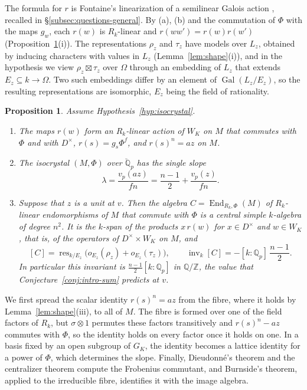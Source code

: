 \documentclass[a4paper,11pt]{amsart}
\newtheorem{proposition}[theorem]{Proposition}
\theoremstyle{definition}
\theoremstyle{remark}
\numberwithin{equation}{section}
\newcommand{\Q}{\mathbb{Q}}
\newcommand{\Z}{\mathbb{Z}}
\DeclareMathOperator{\inv}{inv}
\DeclareMathOperator{\res}{res}
\DeclareMathOperator{\End}{End}
\DeclareMathOperator{\Gal}{Gal}
\newcommand{\Qb}{\breve{\mathbb{Q}}_p}
\begin{document}
The formula for $r$ is Fontaine's linearization of a semilinear Galois action \cite[1.3.1 and~1.3.5]{Fon94}, recalled in \S\ref{subsec:questions-general}. By (a), (b) and the commutation of $\Phi$ with the maps $g_w$, each $r(w)$ is $R_k$-linear and $r(ww')=r(w)r(w')$ (Proposition~\ref{prop:conditional-isocrystal}(i)). The representations $\rho_z$ and $\tau_z$ have models over $L_z$, obtained by inducing characters with values in $L_z$ (Lemma~\ref{lem:shape}(i)), and in the hypothesis we view $\rho_z\boxtimes\tau_z$ over $\Omega$ through an embedding of $L_z$ that extends $E_z\subseteq k\to\Omega$. Two such embeddings differ by an element of $\Gal(L_z/E_z)$, so the resulting representations are isomorphic, $E_z$ being the field of rationality.

\begin{proposition}\label{prop:conditional-isocrystal}
Assume Hypothesis~\ref{hyp:isocrystal}.
\begin{enumerate}
\item[(i)] The maps $r(w)$ form an $R_k$-linear action of $W_K$ on $M$ that commutes with $\Phi$ and with $D^\times$, $r(s)=g_s\Phi^f$, and $r(s)^n=az$ on $M$.
\item[(ii)] The isocrystal $(M,\Phi)$ over $\Qb$ has the single slope
\[
 \lambda=\frac{v_p(az)}{fn}=\frac{n-1}2+\frac{v_p(z)}{fn}.
\]
\item[(iii)] Suppose that $z$ is a unit at $v$. Then the algebra $C=\End_{R_k,\Phi}(M)$ of $R_k$-linear endomorphisms of $M$ that commute with $\Phi$ is a central simple $k$-algebra of degree $n^2$. It is the $k$-span of the products $x\,r(w)$ for $x\in D^\times$ and $w\in W_K$, that is, of the operators of $D^\times\times W_K$ on $M$, and
\[
 [C]=\res_{k/E_z}\bigl(o_{E_z}(\rho_z)+o_{E_z}(\tau_z)\bigr),\qquad \inv_k[C]=-[k:\Q_p]\,\frac{n-1}2.
\]
In particular this invariant is $\frac{n-1}2[k:\Q_p]$ in $\Q/\Z$, the value that Conjecture~\ref{conj:intro-sum} predicts at $v$.
\end{enumerate}
\end{proposition}

We first spread the scalar identity $r(s)^n=az$ from the fibre, where it holds by Lemma~\ref{lem:shape}(iii), to all of $M$. The fibre is formed over one of the field factors of $R_k$, but $\sigma\otimes1$ permutes these factors transitively and $r(s)^n-az$ commutes with $\Phi$, so the identity holds on every factor once it holds on one. In a basis fixed by an open subgroup of $G_K$, the identity becomes a lattice identity for a power of $\Phi$, which determines the slope. Finally, Dieudonn\'e's theorem and the centralizer theorem compute the Frobenius commutant, and Burnside's theorem, applied to the irreducible fibre, identifies it with the image algebra.
\end{document}
